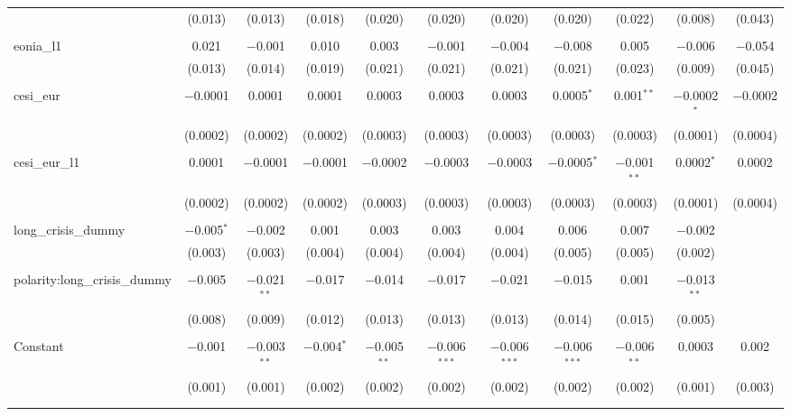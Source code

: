 \begin{table}[!htbp]
\begin{adjustbox}{width=1.35\textwidth}
\begin{tabular}{@{\extracolsep{5pt}}lcccccccccc}
  & (0.013) & (0.013) & (0.018) & (0.020) & (0.020) & (0.020) & (0.020) & (0.022) & (0.008) & (0.043) \\ 
  & & & & & & & & & & \\ 
 eonia\_l1 & 0.021 & $-$0.001 & 0.010 & 0.003 & $-$0.001 & $-$0.004 & $-$0.008 & 0.005 & $-$0.006 & $-$0.054 \\ 
  & (0.013) & (0.014) & (0.019) & (0.021) & (0.021) & (0.021) & (0.021) & (0.023) & (0.009) & (0.045) \\ 
  & & & & & & & & & & \\ 
 cesi\_eur & $-$0.0001 & 0.0001 & 0.0001 & 0.0003 & 0.0003 & 0.0003 & 0.0005$^{*}$ & 0.001$^{**}$ & $-$0.0002$^{*}$ & $-$0.0002 \\ 
  & (0.0002) & (0.0002) & (0.0002) & (0.0003) & (0.0003) & (0.0003) & (0.0003) & (0.0003) & (0.0001) & (0.0004) \\ 
  & & & & & & & & & & \\ 
 cesi\_eur\_l1 & 0.0001 & $-$0.0001 & $-$0.0001 & $-$0.0002 & $-$0.0003 & $-$0.0003 & $-$0.0005$^{*}$ & $-$0.001$^{**}$ & 0.0002$^{*}$ & 0.0002 \\ 
  & (0.0002) & (0.0002) & (0.0002) & (0.0003) & (0.0003) & (0.0003) & (0.0003) & (0.0003) & (0.0001) & (0.0004) \\ 
  & & & & & & & & & & \\ 
 long\_crisis\_dummy & $-$0.005$^{*}$ & $-$0.002 & 0.001 & 0.003 & 0.003 & 0.004 & 0.006 & 0.007 & $-$0.002 &  \\ 
  & (0.003) & (0.003) & (0.004) & (0.004) & (0.004) & (0.004) & (0.005) & (0.005) & (0.002) &  \\ 
  & & & & & & & & & & \\ 
 polarity:long\_crisis\_dummy & $-$0.005 & $-$0.021$^{**}$ & $-$0.017 & $-$0.014 & $-$0.017 & $-$0.021 & $-$0.015 & 0.001 & $-$0.013$^{**}$ &  \\ 
  & (0.008) & (0.009) & (0.012) & (0.013) & (0.013) & (0.013) & (0.014) & (0.015) & (0.005) &  \\ 
  & & & & & & & & & & \\ 
 Constant & $-$0.001 & $-$0.003$^{**}$ & $-$0.004$^{*}$ & $-$0.005$^{**}$ & $-$0.006$^{***}$ & $-$0.006$^{***}$ & $-$0.006$^{***}$ & $-$0.006$^{**}$ & 0.0003 & 0.002 \\ 
  & (0.001) & (0.001) & (0.002) & (0.002) & (0.002) & (0.002) & (0.002) & (0.002) & (0.001) & (0.003) \\ 
  & & & & & & & & & & \\ 
\hline \\[-1.8ex] 

\end{tabular}
\end{adjustbox}
\end{table}

